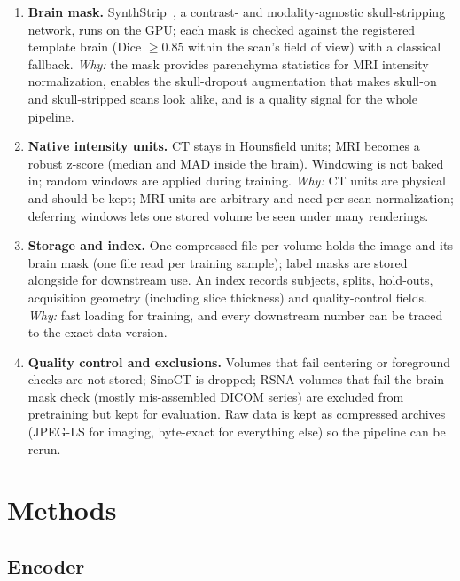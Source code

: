 \documentclass[10pt]{article}
\begin{document}
\begin{enumerate}
  MNI space) and is divisible by every patch depth used.
  \item \textbf{Brain mask.} SynthStrip~\cite{synthstrip}, a contrast- and modality-agnostic skull-stripping network,
  runs on the GPU; each mask is checked against the registered template brain (Dice $\geq 0.85$ within the scan's
  field of view) with a classical fallback. \textit{Why:} the mask provides parenchyma statistics for MRI intensity
  normalization, enables the skull-dropout augmentation that makes skull-on and skull-stripped scans look alike, and
  is a quality signal for the whole pipeline.
  \item \textbf{Native intensity units.} CT stays in Hounsfield units; MRI becomes a robust z-score (median and MAD
  inside the brain). Windowing is not baked in; random windows are applied during training. \textit{Why:} CT units
  are physical and should be kept; MRI units are arbitrary and need per-scan normalization; deferring windows lets one
  stored volume be seen under many renderings.
  \item \textbf{Storage and index.} One compressed file per volume holds the image and its brain mask (one file read
  per training sample); label masks are stored alongside for downstream use. An index records subjects, splits,
  hold-outs, acquisition geometry (including slice thickness) and quality-control fields. \textit{Why:} fast
  loading for training, and every downstream number can be traced to the exact data version.
  \item \textbf{Quality control and exclusions.} Volumes that fail centering or foreground checks are not stored;
  SinoCT is dropped; RSNA volumes that fail the brain-mask check (mostly mis-assembled DICOM series) are excluded from
  pretraining but kept for evaluation. Raw data is kept as compressed archives (JPEG-LS for imaging,
  byte-exact for everything else) so the pipeline can be rerun.
\end{enumerate}

\section{Methods}

\subsection{Encoder}
\end{document}
